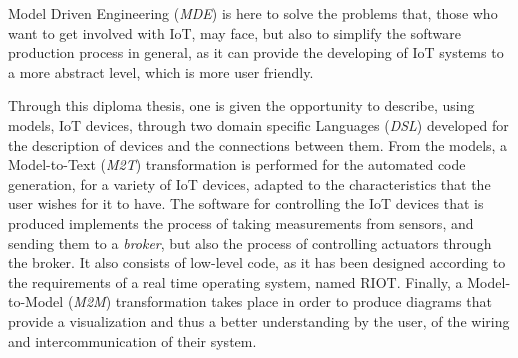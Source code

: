 Model Driven Engineering (\textit{MDE}) is here to solve the problems that, those who want to get involved with IoT, may face, but also to simplify the software production process in general, as it can provide the developing of IoT systems to a more abstract level, which is more user friendly.

Through this diploma thesis, one is given the opportunity to describe, using models, IoT devices, through two domain specific Languages (\textit{DSL}) developed for the description of devices and the connections between them. From the models, a Model-to-Text (\textit{M2T}) transformation is performed for the automated code generation, for a variety of IoT devices, adapted to the characteristics that the user wishes for it to have. The software for controlling the IoT devices that is produced implements the process of taking measurements from sensors, and sending them to a \textit{broker}, but also the process of controlling actuators through the broker. It also consists of low-level code, as it has been designed according to the requirements of a real time operating system, named RIOT. Finally, a Model-to-Model (\textit{M2M}) transformation takes place in order to produce diagrams that provide a visualization and thus a better understanding by the user, of the wiring and intercommunication of their system.